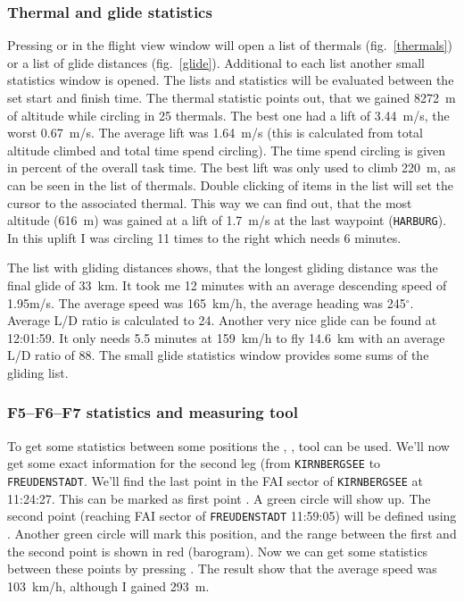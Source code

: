 \subsubsection{Thermal and glide statistics}
Pressing  or  in the flight view window will open a list of thermals (fig.~\ref{thermals}) or a list of glide distances (fig.~\ref{glide}).
Additional to each list another small statistics window is opened. The lists and statistics will be evaluated between the set start and finish time.
The thermal statistic points out, that we gained 8272~m of altitude while circling in 25 thermals. The best one had a lift of 3.44~m/s, the worst 0.67~m/s.
The average lift was 1.64~m/s (this is calculated from total altitude climbed and total time spend circling).
The time spend circling is given in percent of the overall task time. The best lift was only used to climb 220~m, as can be seen in the list of thermals.
Double clicking of items in the list will set the cursor to the associated thermal.
This way we can find out, that the most altitude (616~m) was gained at a lift of 1.7~m/s at the last waypoint (\texttt{HARBURG}).
In this uplift I was circling 11 times to the right which needs 6 minutes.

The list with gliding distances shows, that the longest gliding distance was the final glide of 33~km.
It took me 12 minutes with an average descending speed of 1.95m/s. The average speed was 165~km/h, the average heading was 245$^\circ$.
Average L/D ratio is calculated to 24. Another very nice glide can be found at 12:01:59.
It only needs 5.5 minutes at 159~km/h to fly 14.6~km with an average L/D ratio of 88.
The small glide statistics window provides some sums of the gliding list.


\subsubsection{F5--F6--F7 statistics and measuring tool}
\label{f5f6f7}
To get some statistics between some positions the , ,  tool can be used.
We'll now get some exact information for the second leg (from \texttt{KIRNBERGSEE} to \texttt{FREUDENSTADT}.
We'll find the last point in the FAI sector of \texttt{KIRNBERGSEE} at 11:24:27. This can be marked as first point .
A green circle will show up. The second point (reaching FAI sector of \texttt{FREUDENSTADT} 11:59:05) will be defined using .
Another green circle will mark this position, and the range between the first and the second point is shown in red (barogram).
Now we can get some statistics between these points by pressing .
The result show that the average speed was 103~km/h, although I gained 293~m.


